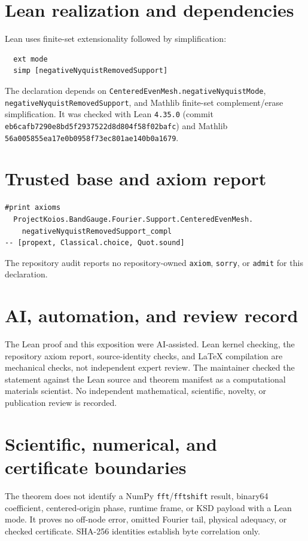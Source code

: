 \documentclass[11pt]{article}
\begin{document}
\section{Lean realization and dependencies}
Lean uses finite-set extensionality followed by simplification:
\begin{verbatim}
  ext mode
  simp [negativeNyquistRemovedSupport]
\end{verbatim}
The declaration depends on \texttt{CenteredEvenMesh.negativeNyquistMode},
\texttt{negativeNyquistRemovedSupport}, and Mathlib finite-set complement/erase simplification.
It was checked with Lean \texttt{4.35.0} (commit
\texttt{eb6cafb7290e8bd5f2937522d8d804f58f02bafc}) and Mathlib
\texttt{56a005855ea17e0b0958f73ec801ae140b0a1679}.

\section{Trusted base and axiom report}
\begin{verbatim}
#print axioms
  ProjectKoios.BandGauge.Fourier.Support.CenteredEvenMesh.
    negativeNyquistRemovedSupport_compl
-- [propext, Classical.choice, Quot.sound]
\end{verbatim}
The repository audit reports no repository-owned \texttt{axiom}, \texttt{sorry}, or
\texttt{admit} for this declaration.

\section{AI, automation, and review record}
The Lean proof and this exposition were AI-assisted.  Lean kernel checking, the repository axiom
report, source-identity checks, and LaTeX compilation are mechanical checks, not independent expert
review.  The maintainer checked the statement against the Lean source and theorem manifest as a
computational materials scientist.  No independent mathematical, scientific, novelty, or
publication review is recorded.

\section{Scientific, numerical, and certificate boundaries}
The theorem does not identify a NumPy \texttt{fft}/\texttt{fftshift} result, binary64 coefficient,
centered-origin phase, runtime frame, or KSD payload with a Lean mode.  It proves no off-node error,
omitted Fourier tail, physical adequacy, or checked certificate.  SHA-256 identities establish
byte correlation only.
\end{document}
